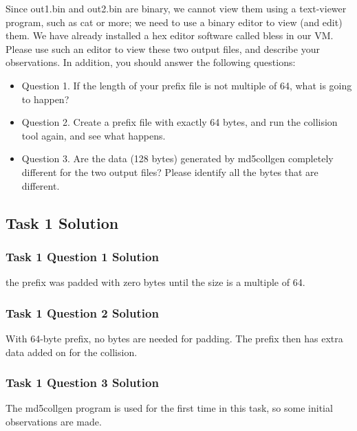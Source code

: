 \documentclass[12pt]{article}
\newcommand\tab[1][0.5cm]{\hspace*{#1}}
\begin{document}
\tab Since out1.bin and out2.bin are binary, we cannot view them using a text-viewer program, such
as cat or more; we need to use a binary editor to view (and edit) them. We have already installed a hex
editor software called bless in our VM. Please use such an editor to view these two output files, and
describe your observations. In addition, you should answer the following questions:
\begin{itemize}
	\item Question 1. If the length of your prefix file is not multiple of 64, what is going to happen?
	\item Question 2. Create a prefix file with exactly 64 bytes, and run the collision tool again, and see what happens.
	\item Question 3. Are the data (128 bytes) generated by md5collgen completely different for the two
output files? Please identify all the bytes that are different.	
\end{itemize}



\subsection{Task 1 Solution}
\subsubsection{Task 1 Question 1 Solution}
the prefix was padded with zero bytes until the size is a multiple of 64.
\subsubsection{Task 1 Question 2 Solution}
With 64-byte prefix, no bytes are needed for padding. The prefix then has extra data added on for the collision.
\subsubsection{Task 1 Question 3 Solution}

The md5collgen program is used for the first time in this task, so some initial observations are made.
\end{document}

